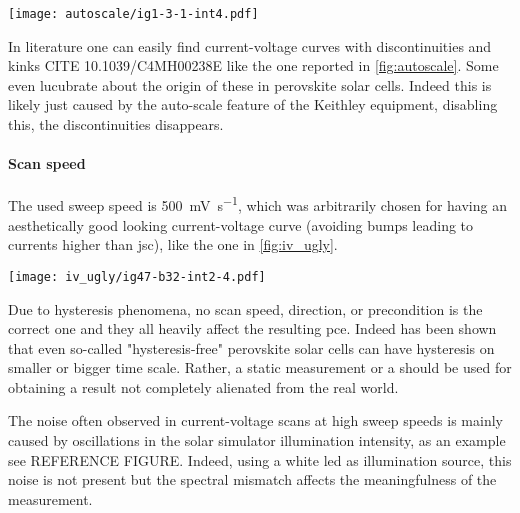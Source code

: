\begin{SCfigure}%
	\centering
	\texttt{[image: autoscale/ig1-3-1-int4.pdf]}
	\label{fig:autoscale}
\end{SCfigure}

In literature one can easily find current-voltage curves with discontinuities and kinks\cite{Li2016,Snaith2014,Zhang2015} CITE  10.1039/C4MH00238E  like the one reported in \cref{fig:autoscale}. Some even lucubrate about the origin of these in perovskite solar cells. Indeed this is likely just caused by the auto-scale feature of the Keithley equipment, disabling this, the discontinuities disappears.

\paragraph{Scan speed}
The used sweep speed is \SI{500}{\mV\per\s}, which was arbitrarily chosen for having an aesthetically good looking current-voltage curve (avoiding bumps leading to currents higher than \gls{jsc}), like the one in \cref{fig:iv_ugly}.

\begin{SCfigure}%
	\centering
	\texttt{[image: iv\_ugly/ig47-b32-int2-4.pdf]}
	\label{fig:iv_ugly}
\end{SCfigure}

Due to hysteresis phenomena, no scan speed, direction, or precondition is the correct one and they all heavily affect the resulting \gls{pce}. Indeed has been shown that even so-called "hysteresis-free" perovskite solar cells can have hysteresis on smaller or bigger time scale\cite{Jacobs2018}. Rather, a static measurement or a  should be used for obtaining a result not completely alienated from the real world.

The noise often observed in current-voltage scans at high sweep speeds is mainly caused by oscillations in the solar simulator illumination intensity, as an example see REFERENCE FIGURE. Indeed, using a white \gls{led} as illumination source, this noise is not present but the spectral mismatch affects the meaningfulness of the measurement.


